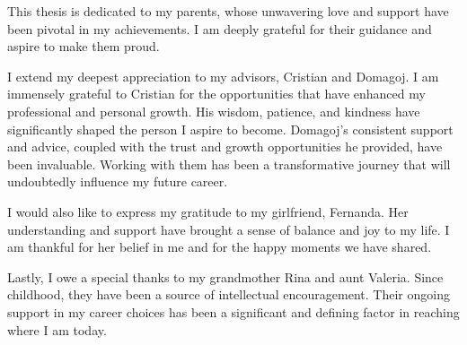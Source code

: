 This thesis is dedicated to my parents, whose unwavering love and support have been pivotal in my achievements. I am deeply grateful for their guidance and aspire to make them proud.

I extend my deepest appreciation to my advisors, Cristian and Domagoj. I am immensely grateful to Cristian for the opportunities that have enhanced my professional and personal growth. His wisdom, patience, and kindness have significantly shaped the person I aspire to become. Domagoj's consistent support and advice, coupled with the trust and growth opportunities he provided, have been invaluable. Working with them has been a transformative journey that will undoubtedly influence my future career.

I would also like to express my gratitude to my girlfriend, Fernanda. Her understanding and support have brought a sense of balance and joy to my life. I am thankful for her belief in me and for the happy moments we have shared.

Lastly, I owe a special thanks to my grandmother Rina and aunt Valeria. Since childhood, they have been a source of intellectual encouragement. Their ongoing support in my career choices has been a significant and defining factor in reaching where I am today.